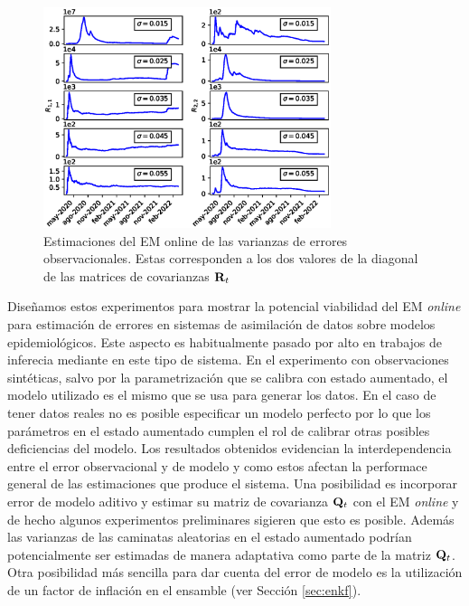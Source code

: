 \begin{figure}[h]
    \centering
    \includegraphics[width=0.75\textwidth]{figs/seird_online_em_aug_state_R_arg_data_sigmas.eps}
    \caption{Estimaciones del EM online de las varianzas de errores observacionales. Estas corresponden a los dos valores de la diagonal de las matrices de covarianzas $\mathbf{R}_t$}
    \label{fig:seird_R_arg_data}
\end{figure}

Diseñamos estos experimentos para mostrar la potencial viabilidad del EM \textit{online} para estimación de errores en sistemas de asimilación de datos sobre modelos epidemiológicos. Este aspecto es habitualmente pasado por alto en trabajos de inferecia mediante en este tipo de sistema. En el experimento con observaciones sintéticas, salvo por la parametrización que se calibra con estado aumentado, el modelo utilizado es el mismo que se usa para generar los datos. En el caso de tener datos reales no es posible especificar un modelo perfecto por lo que los parámetros en el estado aumentado cumplen el rol de calibrar otras posibles deficiencias del modelo. Los resultados obtenidos evidencian la interdependencia entre el error observacional y de modelo y como estos afectan la performace general de las estimaciones que produce el sistema. Una posibilidad es incorporar error de modelo aditivo y estimar su matriz de covarianza $\mathbf{Q}_t$ con el EM \textit{online} y de hecho algunos experimentos preliminares sigieren que esto es posible. Además las varianzas de las caminatas aleatorias en el estado aumentado podrían potencialmente ser estimadas de manera adaptativa como parte de la matriz $\mathbf{Q}_t$. Otra posibilidad más sencilla para dar cuenta del error de modelo es la utilización de un factor de inflación en el ensamble (ver Sección \ref{sec:enkf}).